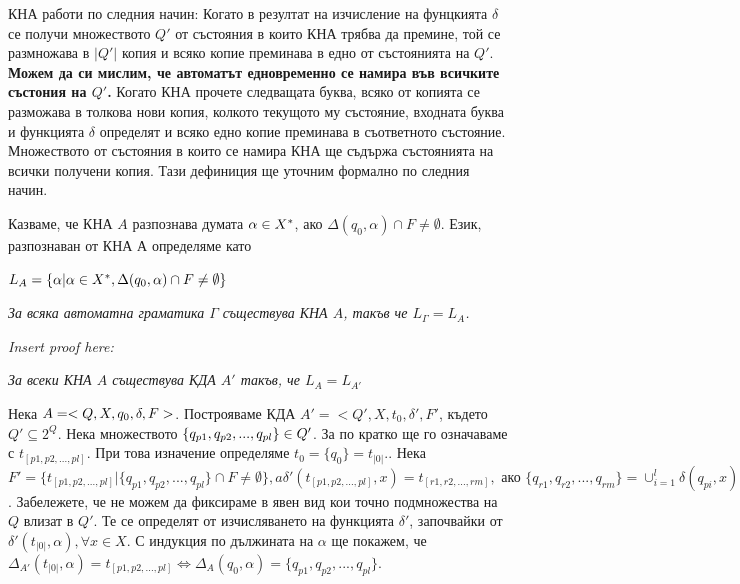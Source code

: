 \documentclass[11pt]{article} %
\begin{document}
КНА работи по следния начин: Когато в резултат на изчисление на фунцкията $\delta$ се получи множеството $Q'$ от състояния в които КНА трябва да премине, той се размножава в $|Q'|$ копия и всяко копие преминава в едно от състоянията на $Q'$. \textbf{Можем да си мислим, че автоматът едновременно се намира във всичките състония на $Q'$.} Когато КНА прочете следващата буква, всяко от копията се разможава в толкова нови копия, колкото текущото му състояние, входната буква и функцията $\delta$ определят и всяко едно копие преминава в съответното състояние. Множеството от състояния в които се намира КНА ще съдържа състоянията на всички получени копия. Тази дефиниция ще уточним формално по следния начин. \par


 Казваме, че КНА $A$ разпознава думата $\alpha \in X^{*}$, ако $\Delta(q_{0}, \alpha) \cap F \neq \emptyset$. Език, разпознаван от КНА $А$ определяме като \\
\centerline{$L_{A} = \{\alpha|\alpha \in X^{*}, \Delta(q_{0}, \alpha)\cap F \neq \emptyset \}$}

\theorem \emph{За всяка автоматна граматика $\Gamma$ съществува КНА $A$, такъв че $L_{\Gamma} = L_{A}$.}\\
\centerline{\emph{Insert proof here:}}

\theorem \emph{За всеки КНА $A$ съществува КДА $A'$ такъв, че $L_{A} = L_{A'}$}

\proof Нека $A = <Q, X, q_{0}, \delta, F>$. Построяваме КДА 
$A' = < Q', X, t_{0}, \delta', F'$, където $Q' \subseteq 2^{Q}$. Нека множеството 
$\{q_{p1}, q_{p2}, ..., q_{pl} \} \in Q'$. За по кратко ще го означаваме с 
$t_{[p1, p2,..., pl ]}$. При това изначение определяме 
$t_{0} = \{q_{0}\} = t_{|0|}.$. Нека 
$F' = \{t_{[p1, p2, ..., pl]}|\{ q_{p1}, q_{p2}, ..., q_{pl} \}
\cap F \neq \emptyset\}, a \delta'(t_{[p1, p2, ... ,pl]}, x) = 
t_{[r1, r2, ..., rm]}, \text{ ако } \{q_{r1}, q_{r2}, ..., q_{rm}\}
= \cup_{i = 1}^{l}\delta(q_{pi}, x)$. Забележете, че не можем да фиксираме в явен вид кои точно подмножества на $Q$ влизат в $Q'$. Те се определят от изчисляването на функцията $\delta'$, започвайки от $\delta'(t_{|0|}, \alpha), \forall x \in X$. 
С индукция по дължината на $\alpha$ ще покажем, че $\Delta_{A'}(t_{|0|}, \alpha) = t_{[p1, p2, ..., pl]} \Leftrightarrow 
\Delta_{A}(q_{0}, \alpha) = \{q_{p1}, q_{p2}, ..., q_{pl}\}$.
\end{document}
